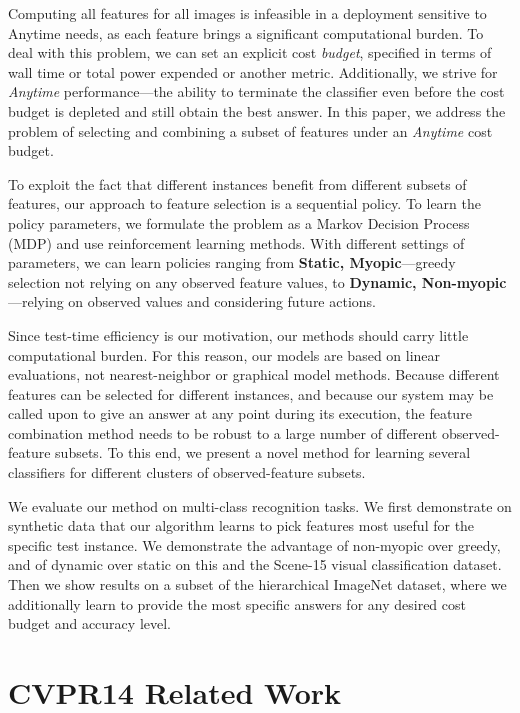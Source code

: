 Computing all features for all images is infeasible in a deployment sensitive to Anytime needs, as each feature brings a significant computational burden.
To deal with this problem, we can set an explicit cost \emph{budget}, specified in terms of wall time or total power expended or another metric.
Additionally, we strive for \emph{Anytime} performance---the ability to terminate the classifier even before the cost budget is depleted and still obtain the best answer.
In this paper, we address the problem of selecting and combining a subset of features under an \emph{Anytime} cost budget.

To exploit the fact that different instances benefit from different subsets of features, our approach to feature selection is a sequential policy.
To learn the policy parameters, we formulate the problem as a Markov Decision Process (MDP) and use reinforcement learning methods.
With different settings of parameters, we can learn policies ranging from \textbf{Static, Myopic}---greedy selection not relying on any observed feature values, to \textbf{Dynamic, Non-myopic}---relying on observed values and considering future actions.

Since test-time efficiency is our motivation, our methods should carry little computational burden.
For this reason, our models are based on linear evaluations, not nearest-neighbor or graphical model methods.
Because different features can be selected for different instances, and because our system may be called upon to give an answer at any point during its execution, the feature combination method needs to be robust to a large number of different observed-feature subsets.
To this end, we present a novel method for learning several classifiers for different clusters of observed-feature subsets.

We evaluate our method on multi-class recognition tasks.
We first demonstrate on synthetic data that our algorithm learns to pick features most useful for the specific test instance.
We demonstrate the advantage of non-myopic over greedy, and of dynamic over static on this and the Scene-15 visual classification dataset.
Then we show results on a subset of the hierarchical ImageNet dataset, where we additionally learn to provide the most specific answers for any desired cost budget and accuracy level.

\section{CVPR14 Related Work}
